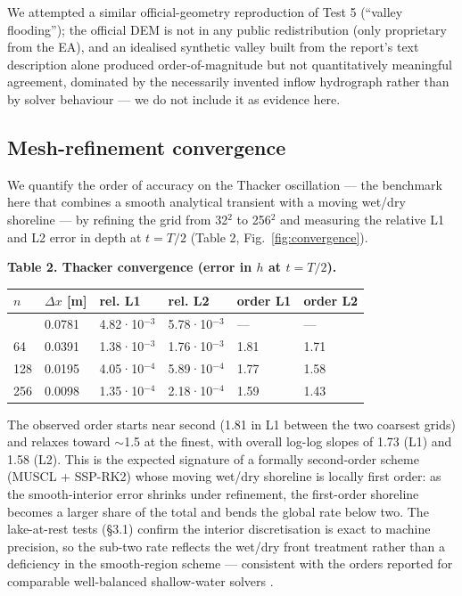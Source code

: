 We attempted a similar official-geometry reproduction of Test 5
(``valley flooding''); the official DEM is not in any public
redistribution (only proprietary from the EA), and an idealised
synthetic valley built from the report's text description alone produced
order-of-magnitude but not quantitatively meaningful agreement,
dominated by the necessarily invented inflow hydrograph rather than by
solver behaviour --- we do not include it as evidence here.

\subsection{Mesh-refinement
convergence}

We quantify the order of accuracy on the Thacker oscillation --- the
benchmark here that combines a smooth analytical transient with a moving
wet/dry shoreline --- by refining the grid from 32$^{2}$ to 256$^{2}$ and
measuring the relative L1 and L2 error in depth at \(t = T/2\) (Table 2,
Fig.~\ref{fig:convergence}).

\textbf{Table 2. Thacker convergence (error in \(h\) at \(t = T/2\)).}

\begin{longtable}[]{@{}llllll@{}}
\toprule\noalign{}
\(n\) & \(\Delta x\) {[}m{]} & rel. L1 & rel. L2 & order L1 & order
L2 \\
\midrule\noalign{}
\endhead
\bottomrule\noalign{}
\endlastfoot
32 & 0.0781 & 4.82·10$^{-3}$ & 5.78·10$^{-3}$ & --- & --- \\
64 & 0.0391 & 1.38·10$^{-3}$ & 1.76·10$^{-3}$ & 1.81 & 1.71 \\
128 & 0.0195 & 4.05·10$^{-4}$ & 5.89·10$^{-4}$ & 1.77 & 1.58 \\
256 & 0.0098 & 1.35·10$^{-4}$ & 2.18·10$^{-4}$ & 1.59 & 1.43 \\
\end{longtable}

The observed order starts near second (1.81 in L1 between the two
coarsest grids) and relaxes toward $\sim$1.5 at the finest,
with overall log-log slopes of 1.73 (L1) and 1.58 (L2). This is the
expected signature of a formally second-order scheme (MUSCL + SSP-RK2)
whose moving wet/dry shoreline is locally first order: as the
smooth-interior error shrinks under refinement, the first-order
shoreline becomes a larger share of the total and bends the global rate
below two. The lake-at-rest tests (§3.1) confirm the interior
discretisation is exact to machine precision, so the sub-two rate
reflects the wet/dry front treatment rather than a deficiency in the
smooth-region scheme --- consistent with the orders reported for
comparable well-balanced shallow-water solvers \citep{LiangMarche2009}.

